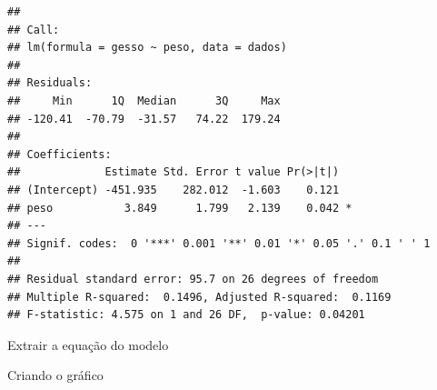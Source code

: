 \documentclass[]{book}
\newenvironment{Shaded}{\begin{snugshade}}{\end{snugshade}}
\newcommand{\DataTypeTok}[1]{\textcolor[rgb]{0.13,0.29,0.53}{#1}}
\newcommand{\DecValTok}[1]{\textcolor[rgb]{0.00,0.00,0.81}{#1}}
\newcommand{\ErrorTok}[1]{\textcolor[rgb]{0.64,0.00,0.00}{\textbf{#1}}}
\newcommand{\KeywordTok}[1]{\textcolor[rgb]{0.13,0.29,0.53}{\textbf{#1}}}
\newcommand{\NormalTok}[1]{#1}
\newcommand{\OperatorTok}[1]{\textcolor[rgb]{0.81,0.36,0.00}{\textbf{#1}}}
\newcommand{\StringTok}[1]{\textcolor[rgb]{0.31,0.60,0.02}{#1}}
\begin{document}
\begin{verbatim}
## 
## Call:
## lm(formula = gesso ~ peso, data = dados)
## 
## Residuals:
##     Min      1Q  Median      3Q     Max 
## -120.41  -70.79  -31.57   74.22  179.24 
## 
## Coefficients:
##             Estimate Std. Error t value Pr(>|t|)  
## (Intercept) -451.935    282.012  -1.603    0.121  
## peso           3.849      1.799   2.139    0.042 *
## ---
## Signif. codes:  0 '***' 0.001 '**' 0.01 '*' 0.05 '.' 0.1 ' ' 1
## 
## Residual standard error: 95.7 on 26 degrees of freedom
## Multiple R-squared:  0.1496, Adjusted R-squared:  0.1169 
## F-statistic: 4.575 on 1 and 26 DF,  p-value: 0.04201
\end{verbatim}

Extrair a equação do modelo

\begin{Shaded}
\end{Shaded}

Criando o gráfico
\end{document}
